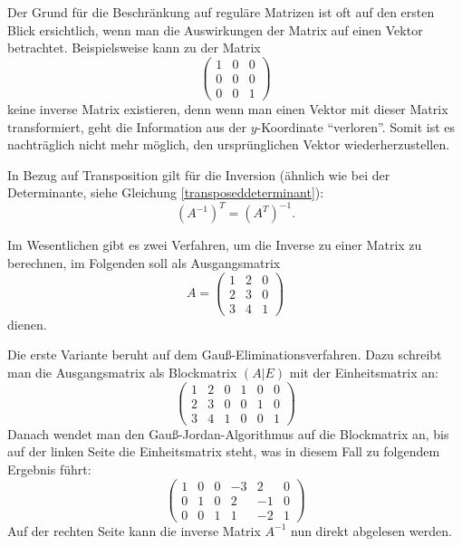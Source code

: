 Der Grund für die Beschränkung auf reguläre Matrizen ist oft auf den ersten Blick ersichtlich, wenn man die Auswirkungen der Matrix auf einen Vektor betrachtet. Beispielsweise kann zu der Matrix
\begin{equation}
 \begin{pmatrix}
  1 & 0 & 0 \\
  0 & 0 & 0 \\
  0 & 0 & 1
 \end{pmatrix}
\end{equation}
keine inverse Matrix existieren, denn wenn man einen Vektor mit dieser Matrix transformiert, geht die Information aus der $y$-Koordinate \enquote{verloren}. Somit ist es nachträglich nicht mehr möglich, den ursprünglichen Vektor wiederherzustellen.

In Bezug auf Transposition gilt für die Inversion (ähnlich wie bei der Determinante, siehe Gleichung \ref{transposeddeterminant}):
\begin{equation}
 (A^{-1})^T = (A^T)^{-1}.
\end{equation}

Im Wesentlichen gibt es zwei Verfahren, um die Inverse zu einer Matrix zu berechnen, im Folgenden soll als Ausgangsmatrix
\begin{equation*}
 A = \begin{pmatrix}
	1 & 2 & 0 \\
    2 & 3 & 0 \\
    3 & 4 & 1
 \end{pmatrix}
\end{equation*}
dienen.

Die erste Variante beruht auf dem Gauß-Eliminationsverfahren. Dazu schreibt man die Ausgangsmatrix als Blockmatrix $(A|E)$ mit der Einheitsmatrix an:
\begin{equation}
 \left(\begin{array}{ccc|ccc}
    1 & 2 & 0 &  1 & 0 & 0 \\
    2 & 3 & 0 &  0 & 1 & 0 \\
    3 & 4 & 1 &  0 & 0 & 1
  \end{array}\right)
\end{equation}
Danach wendet man den Gauß-Jordan-Algorithmus auf die Blockmatrix an, bis auf der linken Seite die Einheitsmatrix steht, was in diesem Fall zu folgendem Ergebnis führt:
\begin{equation}
  \left(\begin{array}{ccc|ccc}
    1 & 0 & 0  & -3 & 2 & 0 \\
    0 & 1 & 0  & 2 & -1 & 0 \\
    0 & 0 & 1  & 1 & -2 & 1
  \end{array}\right)
\end{equation}
Auf der rechten Seite kann die inverse Matrix $A^{-1}$ nun direkt abgelesen werden.

